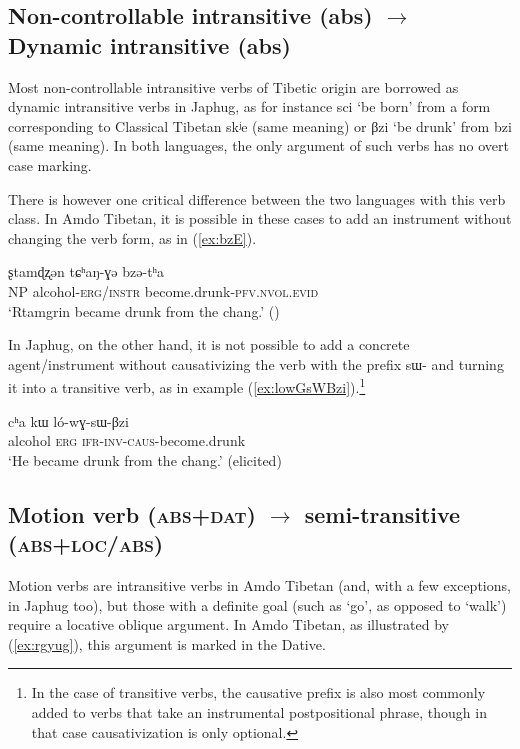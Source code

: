 \documentclass[oldfontcommands,oneside,a4paper,11pt]{article}
\newcommand{\ipa}[1]{{\phon \mbox{#1}}} %
\newcommand{\refb}[1]{(\ref{#1})}
\begin{document}
\subsection{Non-controllable intransitive (abs) $\rightarrow$ Dynamic intransitive (abs)}  
Most non-controllable intransitive verbs of Tibetic origin are borrowed as dynamic intransitive verbs in Japhug, as for instance \ipa{sci} `be born' from a form corresponding to Classical Tibetan \ipa{skʲe} (same meaning) or \ipa{βzi} `be drunk' from \ipa{bzi} (same meaning). In both languages, the only argument of such verbs has no overt case marking.

There is however one critical difference between the two languages with this verb class. In Amdo Tibetan, it is possible in these cases to add an instrument without changing the verb form, as in \refb{ex:bzE}.

\begin{exe}
\ex \label{ex:bzE}
\gll
\ipa{ʂtamɖʐən} 	\ipa{tɕʰaŋ-ɣə} \ipa{bzə-tʰa} 	 \\
NP alcohol-\textsc{erg/instr} become.drunk-\textsc{pfv.nvol.evid} \\
\glt `Rtamgrin became drunk from the chang.' (\citealt[112, ex. 443]{haller04themchen})
\end{exe}

In Japhug, on the other hand, it is not possible to add a concrete agent/instrument without causativizing the verb with the prefix \ipa{sɯ-} and turning it into a transitive verb, as in example \refb{ex:lowGsWBzi}.\footnote{In the case of transitive verbs, the causative prefix is also most commonly added to verbs that take an instrumental postpositional phrase, though in that case causativization is only optional.}

\begin{exe}
\ex \label{ex:lowGsWBzi}
\gll
\ipa{cʰa} 	\ipa{kɯ} 	\ipa{ló-wɣ-sɯ-βzi} \\ 
alcohol \textsc{erg} \textsc{ifr-inv-caus}-become.drunk \\
\glt `He became drunk from the chang.' (elicited)
\end{exe}


\subsection{Motion verb (\textsc{abs+dat}) $\rightarrow$ semi-transitive (\textsc{abs+loc/abs})}  
Motion verbs are intransitive verbs in Amdo Tibetan (and, with a few exceptions, in Japhug too), but those with a definite goal (such as `go', as opposed to `walk') require a locative oblique argument. In Amdo Tibetan, as illustrated by \refb{ex:rgyug}, this argument is marked in the Dative.
\end{document}
